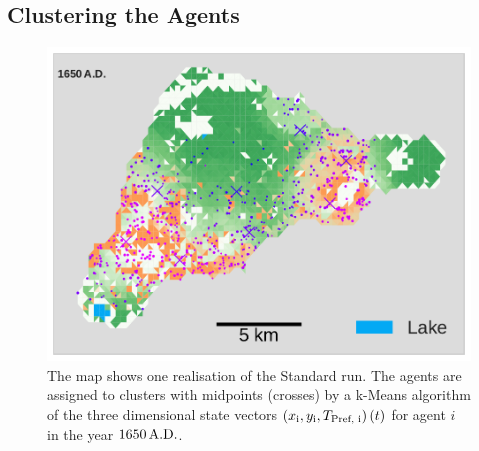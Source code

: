 \subsection*{Clustering the Agents}
\begin{figure}[h]
	\centering
	\includegraphics[width=1\linewidth]{images/ClusterSTDS1650}
	\caption{The map shows one realisation of the Standard run. The agents are assigned to clusters with midpoints (crosses) by a k-Means algorithm of the three dimensional state vectors $\left( x_{\rm i}, y_{\rm i}, T_\text{Pref, i} \right)(t)$ for agent $i$ in the year $1650\, {\rm A.D.}$.}
	\label{fig:clusterstds1650}
\end{figure}

\FloatBarrier
\newpage
